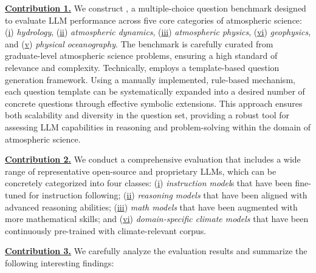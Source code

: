 \textbf{\underline{Contribution 1.}} We construct \name, a multiple-choice question benchmark designed to evaluate LLM performance across five core categories of atmospheric science: (\underline{i}) \textit{hydrology}, (\underline{ii}) \textit{atmospheric dynamics}, (\underline{iii}) \textit{atmospheric physics}, (\underline{vi}) \textit{geophysics}, and (\underline{v}) \textit{physical oceanography}. The benchmark is carefully curated from graduate-level atmospheric science problems, ensuring a high standard of relevance and complexity.
Technically, \name employs a template-based question generation framework. Using a manually implemented, rule-based mechanism, each question template can be systematically expanded into a desired number of concrete questions through effective symbolic extensions. This approach ensures both scalability and diversity in the question set, providing a robust tool for assessing LLM capabilities in reasoning and problem-solving within the domain of atmospheric science.


\textbf{\underline{Contribution 2.}} We conduct a comprehensive evaluation that includes a wide range of representative open-source and proprietary LLMs, which can be concretely categorized into four classes:   (\underline{i}) \textit{instruction model}s that have been fine-tuned for instruction following;  
(\underline{ii}) \textit{reasoning models} that have been aligned with advanced reasoning abilities;  
(\underline{iii}) \textit{math models} that have been augmented with more mathematical skills; and 
(\underline{vi}) \textit{domain-specific climate models} that have been continuously pre-trained with climate-relevant corpus.   


\textbf{\underline{Contribution 3.}} We carefully analyze the evaluation results and summarize the following interesting findings:

